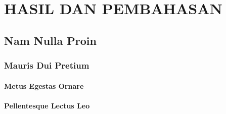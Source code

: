 \chapter{HASIL DAN PEMBAHASAN}
\lipsum[27-29]
\section{Nam Nulla Proin}
\lipsum[18-20]
\subsection{Mauris Dui Pretium}
\lipsum[114-117]
\subsubsection{Metus Egestas Ornare}
\lipsum[126-128]
\subsubsection{Pellentesque Lectus Leo}
\lipsum[54-55]